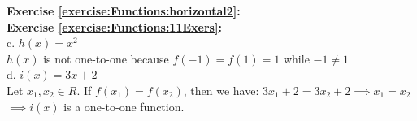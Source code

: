 \noindent\textbf{Exercise \ref{exercise:Functions:horizontal2}:}\\



\noindent\textbf{Exercise \ref{exercise:Functions:11Exers}:}\\
c. $h(x)=x^2$\\
$h(x)$ is not one-to-one because $f(-1)=f(1)=1$ while $-1\neq 1$\\
d. $i(x)=3x+2$\\
Let $x_1,x_2 \in R$. If $f(x_1)=f(x_2)$, then we have:
$3x_1+2=3x_2+2 \implies x_1=x_2$\\
$\implies i(x)$ is a one-to-one function.\\


